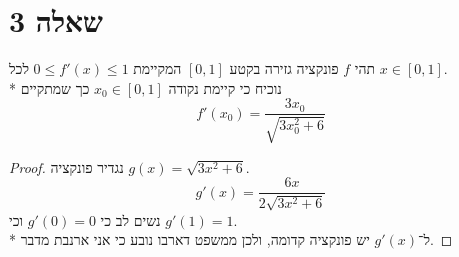 \section{שאלה 3}
תהי $f$ פונקציה גזירה בקטע $[0, 1]$ המקיימת $0 \le f'(x) \le 1$ לכל $x \in [0, 1]$. \\*
נוכיח כי קיימת נקודה $x_0 \in [0, 1]$ כך שמתקיים
\[
	f'(x_0) = \frac{3x_0}{\sqrt{3x_0^2 + 6}}
\]
\begin{proof}
	נגדיר פונקציה $g(x) = \sqrt{3x^2 + 6}$.
	\[
		g'(x) = \frac{6x}{2\sqrt{3x^2 + 6}}
	\]
	נשים לב כי $g'(0) = 0$ וכי $g'(1) = 1$. \\*
	ל־$g'(x)$ יש פונקציה קדומה, ולכן ממשפט דארבו נובע כי אני ארנבת מדבר.
\end{proof}



